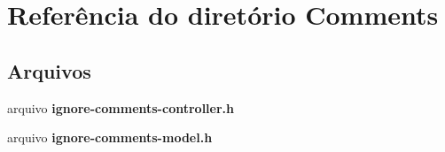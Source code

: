 \section{Referência do diretório Comments}
\label{dir_1d3530a9755007f226a5bde4a60f0cb7}
\subsection*{Arquivos}
\begin{DoxyCompactItemize}
\item 
arquivo {\bf ignore-\/comments-\/controller.\+h}
\item 
arquivo {\bf ignore-\/comments-\/model.\+h}
\end{DoxyCompactItemize}
